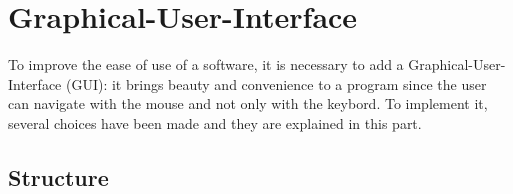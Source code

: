 \section{Graphical-User-Interface}
To improve the ease of use of a software, it is necessary to add a Graphical-User-Interface (GUI): it brings beauty and convenience to a program since the user can navigate with the mouse and not only with the keybord. To implement it, several choices have been made and they are explained in this part.
\subsection{Structure}
\label{sub:structure}